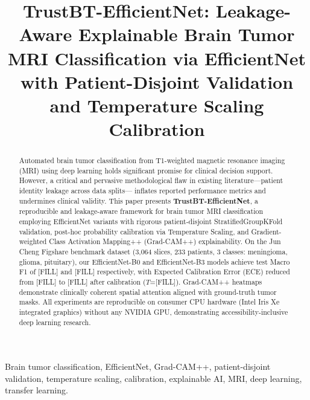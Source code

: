\documentclass[journal]{IEEEtran}
\begin{document}
\title{TrustBT-EfficientNet: Leakage-Aware Explainable Brain Tumor MRI Classification
via EfficientNet with Patient-Disjoint Validation and Temperature Scaling Calibration}

\author{
}

\maketitle

\begin{abstract}
Automated brain tumor classification from T1-weighted magnetic resonance imaging (MRI) using
deep learning holds significant promise for clinical decision support. However, a critical and
pervasive methodological flaw in existing literature—patient identity leakage across data splits—
inflates reported performance metrics and undermines clinical validity. This paper presents
\textbf{TrustBT-EfficientNet}, a reproducible and leakage-aware framework for brain tumor MRI
classification employing EfficientNet variants with rigorous patient-disjoint StratifiedGroupKFold
validation, post-hoc probability calibration via Temperature Scaling, and Gradient-weighted Class
Activation Mapping++ (Grad-CAM++) explainability. On the Jun Cheng Figshare benchmark dataset
(3,064 slices, 233 patients, 3 classes: meningioma, glioma, pituitary), our EfficientNet-B0 and
EfficientNet-B3 models achieve test Macro F1 of [FILL] and [FILL] respectively, with Expected
Calibration Error (ECE) reduced from [FILL] to [FILL] after calibration ($T$=[FILL]).
Grad-CAM++ heatmaps demonstrate clinically coherent spatial attention aligned with ground-truth
tumor masks. All experiments are reproducible on consumer CPU hardware (Intel Iris Xe integrated
graphics) without any NVIDIA GPU, demonstrating accessibility-inclusive deep learning research.
\end{abstract}

\begin{IEEEkeywords}
Brain tumor classification, EfficientNet, Grad-CAM++, patient-disjoint validation,
temperature scaling, calibration, explainable AI, MRI, deep learning, transfer learning.
\end{IEEEkeywords}
\end{document}
